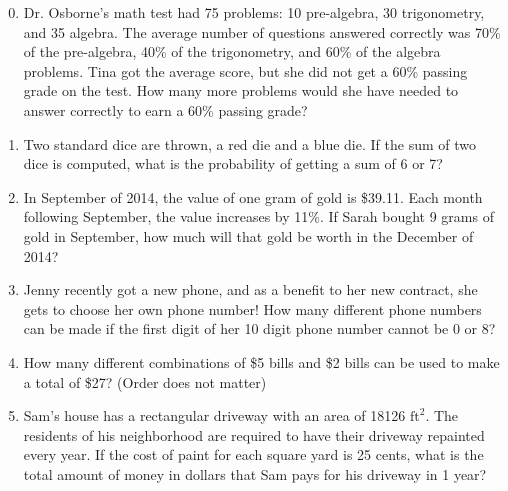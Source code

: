 \documentclass[11pt]{article}
\theoremstyle{definition}
\newcommand{\fdbox}[2]{\fbox{\sffamily\LARGE\vphantom y#1: \bfseries #2} \par\vspace{1em}} %
\begin{document}
\newcommand{\logo}{%
\begin{minipage}[b]{22em}
\centering\noindent
\\[0.5em]
\begin{minipage}[t][4em][t]{12em} \centering
{\huge \bfseries ${\bf 26^{\text{th}}}$ TJIMO } \\
\textsc{\large Alexandria, Virginia}
\end{minipage}
\end{minipage}
\vspace*{-0.05em}
}
\newcommand{\sevenpoints}{}
\newcommand{\righthead}{\fdbox{Round}{Orienteering}}


\begin{enumerate}
\setcounter{enumi}{-1}
\item Dr. Osborne's math test had 75 problems: 10 pre-algebra, 30 trigonometry, and 35 algebra. The average number of questions answered correctly was 70\% of the pre-algebra, 40\% of the trigonometry, and 60\% of the algebra problems. Tina got the average score, but she did not get a 60\% passing grade on the test. How many more problems would she have needed to answer correctly to earn a 60\% passing grade?

\item Two standard dice are thrown, a red die and a blue die. If the sum of two dice is computed, what is the probability of getting a sum of 6 or 7?

\item In September of 2014, the value of one gram of gold is \$39.11.  Each month following September, the value increases by 11\%.  If Sarah bought 9 grams of gold in September, how much will that gold be worth in the December of 2014?

\item Jenny recently got a new phone, and as a benefit to her new contract, she gets to choose her own phone number! How many different phone numbers can be made if the first digit of her 10 digit phone number cannot be 0 or 8?

\item How many different combinations of \$5 bills and \$2 bills can be used to make a total of \$27? (Order does not matter)

\item Sam's house has a rectangular driveway with an area of 18126 $\text{ft}^2$.  The residents of his neighborhood are required to have their driveway repainted every year.  If the cost of paint for each square yard is 25 cents, what is the total amount of money in dollars that Sam pays for his driveway in 1 year?


\end{enumerate}
\end{document}
